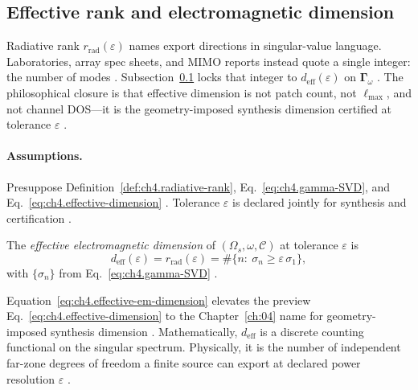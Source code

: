 ﻿\subsection{Effective rank and electromagnetic dimension}
\label{sec:ch464}

Radiative rank \(r_{\mathrm{rad}}(\varepsilon)\) names export directions in singular-value language. Laboratories, array spec sheets, and MIMO
reports instead quote a single integer: the number of modes \cite{harrington2001,devaney2004}. Subsection~\ref{sec:ch464} locks that integer to
\(d_{\mathrm{eff}}(\varepsilon)\) on \(\boldsymbol{\Gamma}_\omega\) \cite{stratton1941,hansen1988}. The philosophical closure is that
effective dimension is not patch count, not \(\ell_{\max}\), and not channel DOS---it is the geometry-imposed synthesis dimension certified at
tolerance \(\varepsilon\) \cite{hansen1988,harrington2001,devaney2004}.

\paragraph{Assumptions.}
Presuppose Definition~\ref{def:ch4.radiative-rank}, Eq.~\eqref{eq:ch4.gamma-SVD}, and Eq.~\eqref{eq:ch4.effective-dimension}
\cite{harrington2001,devaney2004,hansen1988}. Tolerance \(\varepsilon\) is declared jointly for synthesis and certification \cite{stratton1941}.

\begin{definition}
\label{def:ch4.effective-em-dimension}
The \emph{effective electromagnetic dimension} of \((\Omega_{s},\omega,\mathcal{C})\) at tolerance \(\varepsilon\) is
\begin{equation}
\label{eq:ch4.effective-em-dimension}
d_{\mathrm{eff}}(\varepsilon)
=
r_{\mathrm{rad}}(\varepsilon)
=
\#\big\{n:\ \sigma_{n}\ge\varepsilon\,\sigma_{1}\big\},
\end{equation}
with \(\{\sigma_{n}\}\) from Eq.~\eqref{eq:ch4.gamma-SVD} \cite{stratton1941,harrington2001,hansen1988}.
\end{definition}

Equation~\eqref{eq:ch4.effective-em-dimension} elevates the preview Eq.~\eqref{eq:ch4.effective-dimension} to the Chapter~\ref{ch:04}
name for geometry-imposed synthesis dimension \cite{devaney2004}. Mathematically, \(d_{\mathrm{eff}}\) is a discrete counting functional on
the singular spectrum. Physically, it is the number of independent far-zone degrees of freedom a finite source can export at declared power
resolution \(\varepsilon\) \cite{hansen1988,jackson1999}.

